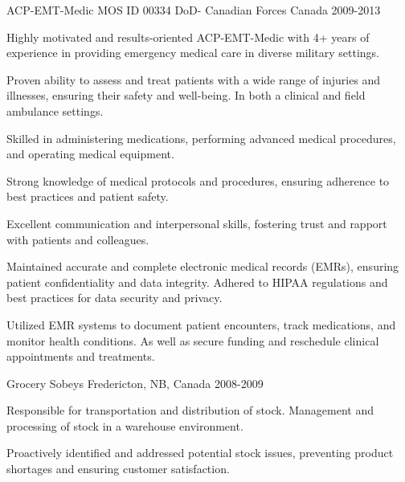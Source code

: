 \begin{cventries}
  \cventry
    {ACP-EMT-Medic MOS ID 00334} %
    {DoD- Canadian Forces} %
    {Canada} %
    {2009-2013} %
    {
      \begin{cvitems} %
        \item {Highly motivated and results-oriented ACP-EMT-Medic with 4+ years of experience in providing emergency medical care in diverse military settings.}
        \item {Proven ability to assess and treat patients with a wide range of injuries and illnesses, ensuring their safety and well-being. In both a clinical and field ambulance settings.}
        \item {Skilled in administering medications, performing advanced medical procedures, and operating medical equipment.}
        \item {Strong knowledge of medical protocols and procedures, ensuring adherence to best practices and patient safety.}
        \item {Excellent communication and interpersonal skills, fostering trust and rapport with patients and colleagues.}
        \item {Maintained accurate and complete electronic medical records (EMRs), ensuring patient confidentiality and data integrity. Adhered to HIPAA regulations and best practices for data security and privacy.}
        \item {Utilized EMR systems to document patient encounters, track medications, and monitor health conditions. As well as secure funding and reschedule clinical appointments and treatments.}
      \end{cvitems}
    }

  \cventry
    {Grocery} %
    {Sobeys} %
    {Fredericton, NB, Canada} %
    {2008-2009} %
    {
      \begin{cvitems} %
        \item {Responsible for transportation and distribution of stock. Management and processing of stock in a warehouse environment.}
        \item {Proactively identified and addressed potential stock issues, preventing product shortages and ensuring customer satisfaction.}
      \end{cvitems}
    }

\end{cventries}
